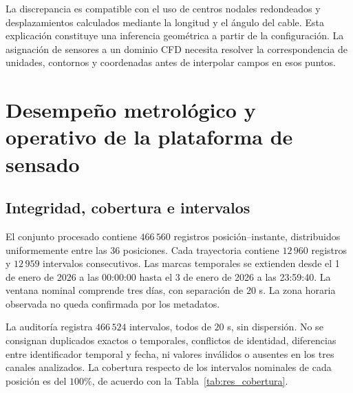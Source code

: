 La discrepancia es compatible con el uso de centros nodales redondeados y desplazamientos calculados mediante la longitud y el ángulo del cable. Esta explicación constituye una inferencia geométrica a partir de la configuración. La asignación de sensores a un dominio CFD necesita resolver la correspondencia de unidades, contornos y coordenadas antes de interpolar campos en esos puntos.



\FloatBarrier

\section{Desempeño metrológico y operativo de la plataforma de sensado}
\label{res:sensado}

\subsection{Integridad, cobertura e intervalos}

El conjunto procesado contiene $466\,560$ registros posición--instante, distribuidos uniformemente entre las $36$ posiciones. Cada trayectoria contiene $12\,960$ registros y $12\,959$ intervalos consecutivos. Las marcas temporales se extienden desde el 1 de enero de 2026 a las 00:00:00 hasta el 3 de enero de 2026 a las 23:59:40. La ventana nominal comprende tres días, con separación de $20$ s. La zona horaria observada no queda confirmada por los metadatos.

La auditoría registra $466\,524$ intervalos, todos de $20$ s, sin dispersión. No se consignan duplicados exactos o temporales, conflictos de identidad, diferencias entre identificador temporal y fecha, ni valores inválidos o ausentes en los tres canales analizados. La cobertura respecto de los intervalos nominales de cada posición es del $100\%$, de acuerdo con la Tabla~\ref{tab:res_cobertura}.

